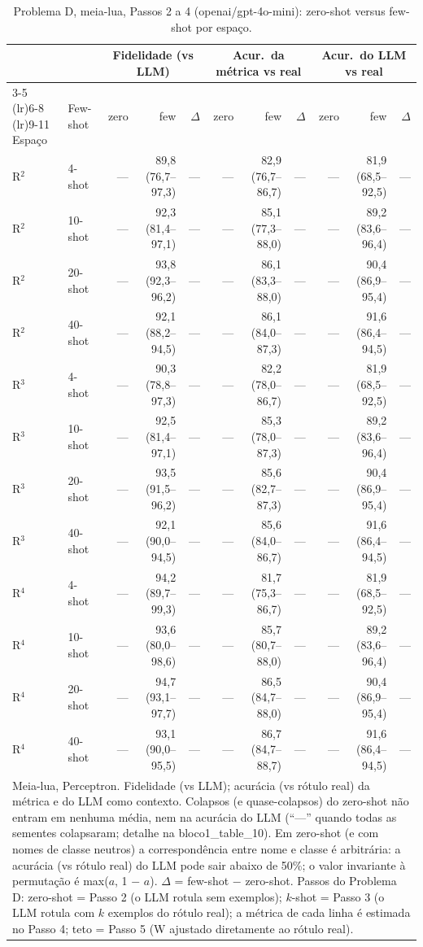 \begin{table}[htbp]
\centering
\footnotesize
\caption{Problema D, meia-lua, Passos 2 a 4 (openai/gpt-4o-mini): zero-shot versus few-shot por espaço.}
\label{tab:bloco1_D_passo2_vs_passo3_gpt4mini}
\begin{tabular}{llrrrrrrrrr}
\toprule
 &  & \multicolumn{3}{c}{Fidelidade (vs LLM)} & \multicolumn{3}{c}{Acur.\ da métrica vs real} & \multicolumn{3}{c}{Acur.\ do LLM vs real} \\ \cmidrule(lr){3-5} \cmidrule(lr){6-8} \cmidrule(lr){9-11}
Espaço & Few-shot & zero & few & $\Delta$ & zero & few & $\Delta$ & zero & few & $\Delta$ \\
\midrule
R$^2$ & 4-shot & — & 89,8 (76,7–97,3) & — & — & 82,9 (76,7–86,7) & — & — & 81,9 (68,5–92,5) & — \\
R$^2$ & 10-shot & — & 92,3 (81,4–97,1) & — & — & 85,1 (77,3–88,0) & — & — & 89,2 (83,6–96,4) & — \\
R$^2$ & 20-shot & — & 93,8 (92,3–96,2) & — & — & 86,1 (83,3–88,0) & — & — & 90,4 (86,9–95,4) & — \\
R$^2$ & 40-shot & — & 92,1 (88,2–94,5) & — & — & 86,1 (84,0–87,3) & — & — & 91,6 (86,4–94,5) & — \\
\midrule
R$^3$ & 4-shot & — & 90,3 (78,8–97,3) & — & — & 82,2 (78,0–86,7) & — & — & 81,9 (68,5–92,5) & — \\
R$^3$ & 10-shot & — & 92,5 (81,4–97,1) & — & — & 85,3 (78,0–87,3) & — & — & 89,2 (83,6–96,4) & — \\
R$^3$ & 20-shot & — & 93,5 (91,5–96,2) & — & — & 85,6 (82,7–87,3) & — & — & 90,4 (86,9–95,4) & — \\
R$^3$ & 40-shot & — & 92,1 (90,0–94,5) & — & — & 85,6 (84,0–86,7) & — & — & 91,6 (86,4–94,5) & — \\
\midrule
R$^4$ & 4-shot & — & 94,2 (89,7–99,3) & — & — & 81,7 (75,3–86,7) & — & — & 81,9 (68,5–92,5) & — \\
R$^4$ & 10-shot & — & 93,6 (80,0–98,6) & — & — & 85,7 (80,7–88,0) & — & — & 89,2 (83,6–96,4) & — \\
R$^4$ & 20-shot & — & 94,7 (93,1–97,7) & — & — & 86,5 (84,7–88,0) & — & — & 90,4 (86,9–95,4) & — \\
R$^4$ & 40-shot & — & 93,1 (90,0–95,5) & — & — & 86,7 (84,7–88,7) & — & — & 91,6 (86,4–94,5) & — \\
\bottomrule
\multicolumn{11}{p{0.95\linewidth}}{\footnotesize Meia-lua, Perceptron. Fidelidade (vs LLM); acurácia (vs rótulo real) da métrica e do LLM como contexto. Colapsos (e quase-colapsos) do zero-shot não entram em nenhuma média, nem na acurácia do LLM (``—'' quando todas as sementes colapsaram; detalhe na bloco1\_table\_10). Em zero-shot (e com nomes de classe neutros) a correspondência entre nome e classe é arbitrária: a acurácia (vs rótulo real) do LLM pode sair abaixo de 50\%; o valor invariante à permutação é max($a$, 1 $-$ $a$). $\Delta$ = few-shot $-$ zero-shot. Passos do Problema D: zero-shot = Passo 2 (o LLM rotula sem exemplos); $k$-shot = Passo 3 (o LLM rotula com $k$ exemplos do rótulo real); a métrica de cada linha é estimada no Passo 4; teto = Passo 5 (W ajustado diretamente ao rótulo real).} \\
\end{tabular}
\end{table}
